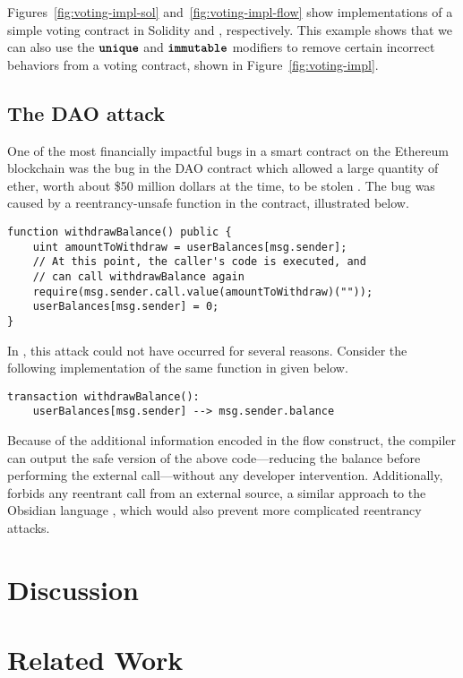 \documentclass[dvipsnames, usenames, sigconf]{acmart}
\begin{document}
Figures~\ref{fig:voting-impl-sol} and~\ref{fig:voting-impl-flow} show implementations of a simple voting contract in Solidity and \langName, respectively.
This example shows that we can also use the $\textbf{\texttt{unique}}$ and $\textbf{\texttt{immutable}}$ modifiers to remove certain incorrect behaviors from a voting contract, shown in Figure~\ref{fig:voting-impl}.

\subsection{The DAO attack}
One of the most financially impactful bugs in a smart contract on the Ethereum blockchain was the bug in the DAO contract which allowed a large quantity of ether, worth about \$50 million dollars at the time, to be stolen .
The bug was caused by a reentrancy-unsafe function in the contract, illustrated below.
\begin{lstlisting}[language=Solidity]
function withdrawBalance() public {
    uint amountToWithdraw = userBalances[msg.sender];
    // At this point, the caller's code is executed, and
    // can call withdrawBalance again
    require(msg.sender.call.value(amountToWithdraw)(""));
    userBalances[msg.sender] = 0;
}
\end{lstlisting}

In \langName, this attack could not have occurred for several reasons.
Consider the following implementation of the same function in \langName given below.
\begin{lstlisting}[language=flow]
transaction withdrawBalance():
    userBalances[msg.sender] --> msg.sender.balance
\end{lstlisting}
Because of the additional information encoded in the flow construct, the compiler can output the safe version of the above code---reducing the balance before performing the external call---without any developer intervention.
Additionally, \langName forbids any reentrant call from an external source, a similar approach to the Obsidian language , which would also prevent more complicated reentrancy attacks.

\section{Discussion}

\section{Related Work}
\end{document}
